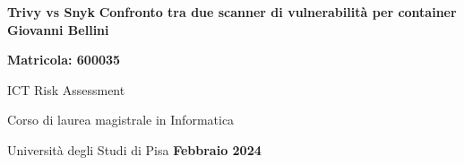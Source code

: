 \documentclass[12pt]{report}
\begin{document}
\begin{center}
   \vspace*{1cm}
   \Huge
   \textbf{Trivy vs Snyk}
   \vspace{0.5cm}
   \Large
   \vfill
   \textbf{Confronto tra due scanner di vulnerabilità per container}
   \vspace{1.5cm}
   \large
   \vfill
   \textbf{Giovanni Bellini}

   \textbf{Matricola: 600035}

   ICT Risk Assessment

      {Corso di laurea magistrale in Informatica}

      {Università degli Studi di Pisa}
   \vfill
   \Large
   \textbf{Febbraio 2024}
\end{center}

\pagebreak
\tableofcontents




\end{document}
